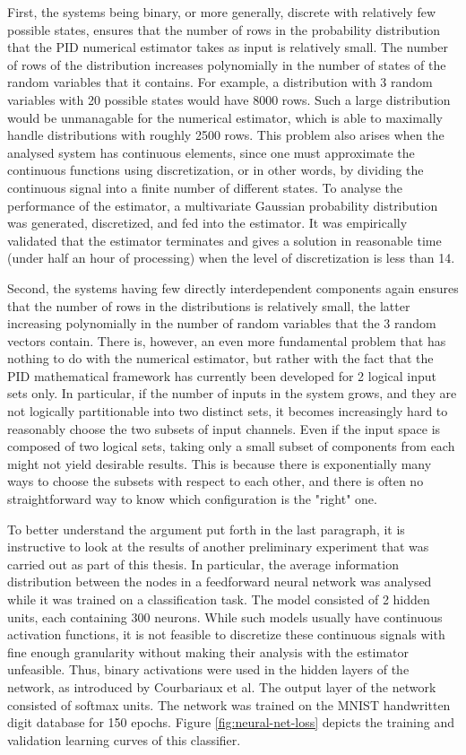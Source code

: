 \documentclass[12pt]{article}
\begin{document}
First, the systems being binary, or more generally, discrete with relatively few possible states, ensures that the number of rows in the probability distribution that the PID numerical estimator takes as input is relatively small. The number of rows of the distribution increases polynomially in the number of states of the random variables that it contains. For example, a distribution with 3 random variables with 20 possible states would have 8000 rows. Such a large distribution would be unmanagable for the numerical estimator, which is able to maximally handle distributions with roughly 2500 rows. This problem also arises when the analysed system has continuous elements, since one must approximate the continuous functions using discretization, or in other words, by dividing the continuous signal into a finite number of different states. To analyse the performance of the estimator, a multivariate Gaussian probability distribution was generated, discretized, and fed into the estimator. It was empirically validated that the estimator terminates and gives a solution in reasonable time (under half an hour of processing) when the level of discretization is less than 14.   

Second, the systems having few directly interdependent components again ensures that the number of rows in the distributions is relatively small, the latter increasing polynomially in the number of random variables that the 3 random vectors contain. There is, however, an even more fundamental problem that has nothing to do with the numerical estimator, but rather with the fact that the PID mathematical framework has currently been developed for 2 logical input sets only. In particular, if the number of inputs in the system grows, and they are not logically partitionable into two distinct sets, it becomes increasingly hard to reasonably choose the two subsets of input channels. Even if the input space is composed of two logical sets, taking only a small subset of components from each might not yield desirable results. This is because  there is exponentially many ways to choose the subsets with respect to each other, and there is often no straightforward way to know which configuration is the "right" one. 

To better understand the argument put forth in the last paragraph, it is instructive to look at the results of another preliminary experiment that was carried out as part of this thesis. In particular, the average information distribution between the nodes in a feedforward neural network was analysed while it was trained on a classification task. The model consisted of 2 hidden units, each containing 300 neurons. While such models usually have continuous activation functions, it is not feasible to discretize these continuous signals with fine enough granularity without making their analysis with the estimator unfeasible. Thus, binary activations were used in the hidden layers of the network, as introduced by Courbariaux et al. \cite{binary-nets} The output layer of the network consisted of softmax units. The network was trained on the MNIST handwritten digit database \cite{mnistlecun} for 150 epochs. Figure \ref{fig:neural-net-loss} depicts the training and validation learning curves of this classifier.
\end{document}
